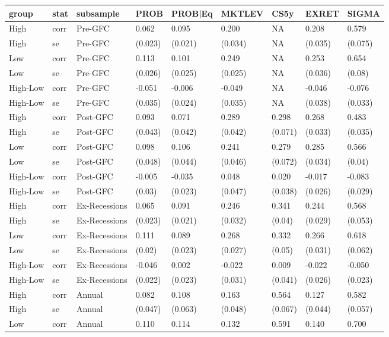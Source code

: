
\begin{tabular}{l|l|l|l|l|l|l|l|l}
\hline
group & stat & subsample & PROB & PROB|Eq & MKTLEV & CS5y & EXRET & SIGMA\\
\hline
High & corr & Pre-GFC & 0.062 & 0.095 & 0.200 & NA & 0.208 & 0.579\\
High & se & Pre-GFC & (0.023) & (0.021) & (0.034) & NA & (0.035) & (0.075)\\
Low & corr & Pre-GFC & 0.113 & 0.101 & 0.249 & NA & 0.253 & 0.654\\
Low & se & Pre-GFC & (0.026) & (0.025) & (0.025) & NA & (0.036) & (0.08)\\
High-Low & corr & Pre-GFC & -0.051 & -0.006 & -0.049 & NA & -0.046 & -0.076\\
High-Low & se & Pre-GFC & (0.035) & (0.024) & (0.035) & NA & (0.038) & (0.033)\\
High & corr & Post-GFC & 0.093 & 0.071 & 0.289 & 0.298 & 0.268 & 0.483\\
High & se & Post-GFC & (0.043) & (0.042) & (0.042) & (0.071) & (0.033) & (0.035)\\
Low & corr & Post-GFC & 0.098 & 0.106 & 0.241 & 0.279 & 0.285 & 0.566\\
Low & se & Post-GFC & (0.048) & (0.044) & (0.046) & (0.072) & (0.034) & (0.04)\\
High-Low & corr & Post-GFC & -0.005 & -0.035 & 0.048 & 0.020 & -0.017 & -0.083\\
High-Low & se & Post-GFC & (0.03) & (0.023) & (0.047) & (0.038) & (0.026) & (0.029)\\
High & corr & Ex-Recessions & 0.065 & 0.091 & 0.246 & 0.341 & 0.244 & 0.568\\
High & se & Ex-Recessions & (0.023) & (0.021) & (0.032) & (0.04) & (0.029) & (0.053)\\
Low & corr & Ex-Recessions & 0.111 & 0.089 & 0.268 & 0.332 & 0.266 & 0.618\\
Low & se & Ex-Recessions & (0.02) & (0.023) & (0.027) & (0.05) & (0.031) & (0.062)\\
High-Low & corr & Ex-Recessions & -0.046 & 0.002 & -0.022 & 0.009 & -0.022 & -0.050\\
High-Low & se & Ex-Recessions & (0.022) & (0.023) & (0.031) & (0.041) & (0.026) & (0.023)\\
High & corr & Annual & 0.082 & 0.108 & 0.163 & 0.564 & 0.127 & 0.582\\
High & se & Annual & (0.047) & (0.063) & (0.048) & (0.067) & (0.044) & (0.057)\\
Low & corr & Annual & 0.110 & 0.114 & 0.132 & 0.591 & 0.140 & 0.700\\

\end{tabular}
